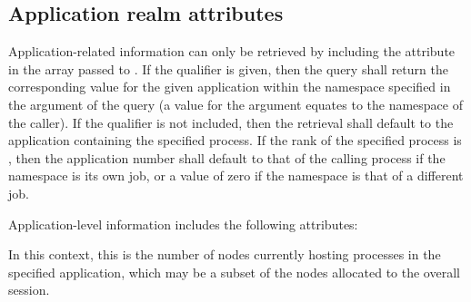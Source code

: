 %

%


\subsection{Application realm attributes}
\label{chap:res:aprealm}

Application-related information can only be retrieved by including the
 attribute in the  array passed to
. If the  qualifier is given, then the
query shall return the corresponding value for the given application within the
namespace specified in the  argument of the query (a 
value for the  argument equates to the namespace of the caller).
If the  qualifier is not included, then the retrieval
shall default to the application containing the specified process. If the rank
of the specified process is ,
then the application number shall default to that of the calling process if the
namespace is its own job, or a value of zero if the namespace is that of a
different job.

Application-level information includes the following attributes:


%
In this context, this is the number of
nodes currently hosting processes in the specified application, which may be a
subset of the nodes allocated to the overall session.
\pasteAttributeItemEnd{}

%

%

